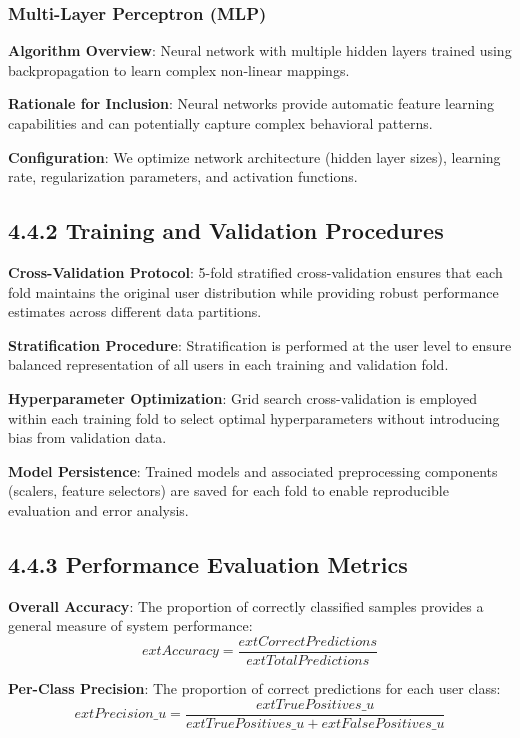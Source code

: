 \documentclass[
  12pt,
  a4paper,
]{report}
\begin{document}
\subsubsection{Multi-Layer Perceptron
(MLP)}\label{multi-layer-perceptron-mlp}

\textbf{Algorithm Overview}: Neural network with multiple hidden layers
trained using backpropagation to learn complex non-linear mappings.

\textbf{Rationale for Inclusion}: Neural networks provide automatic
feature learning capabilities and can potentially capture complex
behavioral patterns.

\textbf{Configuration}: We optimize network architecture (hidden layer
sizes), learning rate, regularization parameters, and activation
functions.

\subsection{4.4.2 Training and Validation
Procedures}\label{training-and-validation-procedures}

\textbf{Cross-Validation Protocol}: 5-fold stratified cross-validation
ensures that each fold maintains the original user distribution while
providing robust performance estimates across different data partitions.

\textbf{Stratification Procedure}: Stratification is performed at the
user level to ensure balanced representation of all users in each
training and validation fold.

\textbf{Hyperparameter Optimization}: Grid search cross-validation is
employed within each training fold to select optimal hyperparameters
without introducing bias from validation data.

\textbf{Model Persistence}: Trained models and associated preprocessing
components (scalers, feature selectors) are saved for each fold to
enable reproducible evaluation and error analysis.

\subsection{4.4.3 Performance Evaluation
Metrics}\label{performance-evaluation-metrics}

\textbf{Overall Accuracy}: The proportion of correctly classified
samples provides a general measure of system performance:
\[ ext{Accuracy} = \frac{ ext{Correct Predictions}}{ ext{Total Predictions}}\]

\textbf{Per-Class Precision}: The proportion of correct predictions for
each user class:
\[ ext{Precision}\_u = \frac{ ext{True Positives}\_u}{ ext{True Positives}\_u + ext{False Positives}\_u}\]
\end{document}
